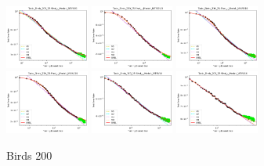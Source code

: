 \documentclass{article} %
\begin{document}
\begin{figure}[!htb]
\includegraphics[width=0.245\textwidth]{figures/scaling_laws_benchmark_dataset_plots__all_functional_forms/birds_25___BiT_50_1.png}
\includegraphics[width=0.245\textwidth]{figures/scaling_laws_benchmark_dataset_plots__all_functional_forms/birds_25___BiT_101_3.png}
\includegraphics[width=0.245\textwidth]{figures/scaling_laws_benchmark_dataset_plots__all_functional_forms/birds_25___MiX_B_16.png}
\includegraphics[width=0.245\textwidth]{figures/scaling_laws_benchmark_dataset_plots__all_functional_forms/birds_25___MiX_L_16.png}
\includegraphics[width=0.245\textwidth]{figures/scaling_laws_benchmark_dataset_plots__all_functional_forms/birds_25___ViT_B_16.png}
\includegraphics[width=0.245\textwidth]{figures/scaling_laws_benchmark_dataset_plots__all_functional_forms/birds_25___ViT_S_16.png}
\caption{
    Birds 200
    }
    \label{fig:scaling_laws_benchmark_dataset_all_extrapolations__birds}
\end{figure}
\end{document}

